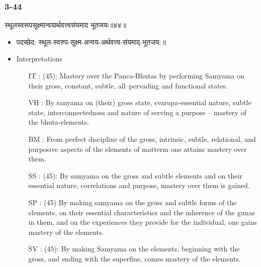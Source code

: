 \begin{frame}[fragile]\frametitle{3-44}
\begin{sanskrit}
स्थूलस्वरूपसूक्ष्मान्वयार्थवत्त्वसंयमाद भूतजयः॥४४॥
\end{sanskrit}

	\begin{itemize}
	\item पदच्छेद:  स्थूल-स्वरुप-सूक्ष्म-अन्वय-अर्थवत्त्व-‌संयमाद्-भूतजय:॥
	\item Interpretations
		\begin{itemize}	
		\item [IT]: (45): Mastery over the Panca-Bhutas by performing Samyama on their gross, constant, subtle, all–pervading and functional states.
		\item [VH]: By sanyama on (their) gross state, svarupa-essential nature, subtle state, interconnectedness and nature of serving a purpose – mastery of the bhuta-elements.
		\item [BM]: From perfect discipline of the gross, intrinsic, subtle, relational, and purposive aspects of the elements of matterm one attains mastery over them.
		\item [SS]: (45): By samyama on the gross and subtle elements and on their essential nature, correlations and purpose, mastery over them is gained.
		\item [SP]: (45) By making samyama on the gross and subtle forms of the elements, on their essential characteristics and the inherence of the gunas in them, and on the experiences they provide for the individual, one gains mastery of the elements.
		\item [SV]: (45): By making Samyama on the elements, beginning with the gross, and ending with the superfine, comes mastery of the elements.
		\end{itemize}
	\end{itemize}
\end{frame}


